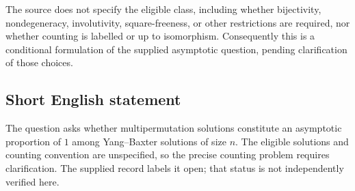 \documentclass[11pt]{article}
\begin{document}
The source does not specify the eligible class, including whether bijectivity, nondegeneracy, involutivity, square-freeness, or other restrictions are required, nor whether counting is labelled or up to isomorphism. Consequently this is a conditional formulation of the supplied asymptotic question, pending clarification of those choices.
\subsection{Short English statement}
The question asks whether multipermutation solutions constitute an asymptotic proportion of \(1\) among Yang--Baxter solutions of size \(n\). The eligible solutions and counting convention are unspecified, so the precise counting problem requires clarification. The supplied record labels it open; that status is not independently verified here.
\end{document}
